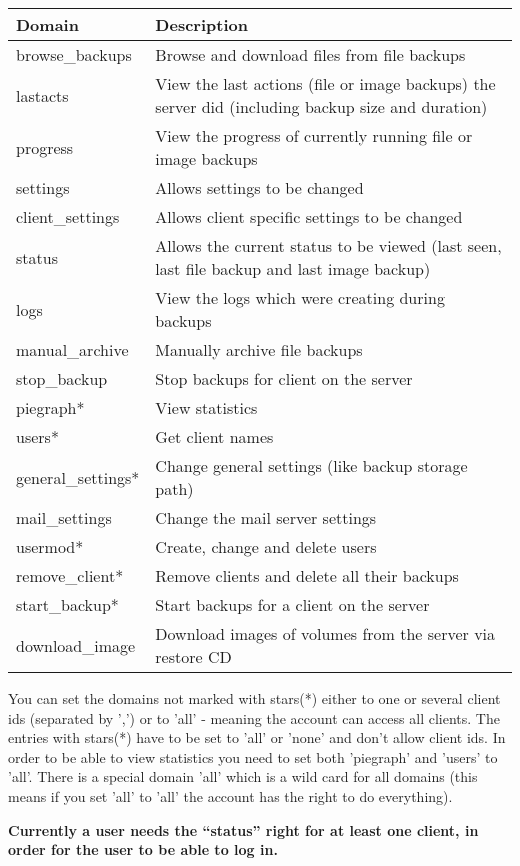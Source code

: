 \documentclass[a4paper,10pt]{article}
\begin{document}
\begin{tabular}{|l|p{}|}
\hline
Domain  & Description \\
\hline\hline
browse\_backups & Browse and download files from file backups\\
lastacts & View the last actions (file or image backups) the server did (including backup size and duration)\\
progress & View the progress of currently running file or image backups\\
settings & Allows settings to be changed \\
client\_settings & Allows client specific settings to be changed \\
status & Allows the current status to be viewed (last seen, last file backup and last image backup)\\
logs & View the logs which were creating during backups\\
manual\_archive & Manually archive file backups\\
stop\_backup & Stop backups for client on the server\\
piegraph* & View statistics\\
users* & Get client names\\
general\_settings* & Change general settings (like backup storage path)\\
mail\_settings & Change the mail server settings \\
usermod* & Create, change and delete users\\
remove\_client* & Remove clients and delete all their backups\\
start\_backup* & Start backups for a client on the server\\
download\_image & Download images of volumes from the server via restore CD\\

\hline
\end{tabular}

You can set the domains not marked with stars(*) either to one or several client ids (separated by ',') or to 'all' - meaning the account can access all clients. The entries with stars(*) have to be set to 'all' or 'none' and don't allow client ids. In order to be able to view statistics you need to set both 'piegraph' and 'users' to 'all'. There is a special domain 'all' which is a wild card for all domains (this means if you set 'all' to 'all' the account has the right to do everything).

\textbf{Currently a user needs the ``status'' right for at least one client, in order for the user to be able to log in.}
\end{document}
